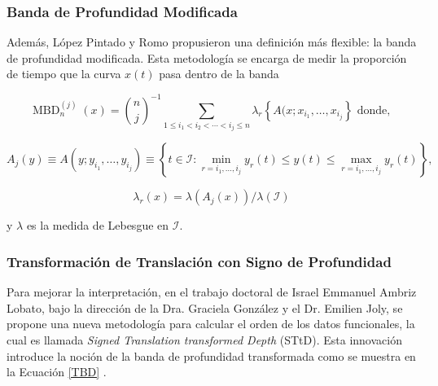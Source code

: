 \subsubsection{Banda de Profundidad Modificada}

Además, López Pintado y Romo propusieron una definición más flexible: la banda de profundidad modificada. Esta metodología se encarga de medir la proporción de tiempo que la curva $x(t)$ pasa dentro de la banda \cite{boxplotFun}

\begin{equation}
    \operatorname{MBD}_n^{(j)}(x) = \binom{n}{j}^{-1} \sum_{1 \leq i_1<i_2<\cdots<i_j \leq n} \lambda_r \left\{ A(x ; x_{i_{1}}, \dots, x_{i_{j}}\right\} \text{ donde, }
\end{equation}

\begin{equation}
     A_j(y) \equiv A\left(y ; y_{i_1}, \ldots, y_{i_j}\right) \equiv \left\{t \in \mathcal{I}: \min _{r=i_1, \ldots, i_j} y_r(t) \leq y(t) \leq \max _{r=i_1, \ldots, i_j} y_r(t) \right\},
\end{equation}

\begin{equation}
    \lambda_r(x) = \lambda(A_j(x))/\lambda(\mathcal{I})
\end{equation}

y $\lambda$ es la medida de Lebesgue en $\mathcal{I}$.
\subsubsection{Transformación de Translación con Signo de Profundidad}

    Para mejorar la interpretación, en el trabajo doctoral de Israel Emmanuel Ambriz Lobato, bajo la dirección de la Dra. Graciela González y el Dr. Emilien Joly, se propone una nueva metodología para calcular el orden de los datos funcionales, la cual es llamada \textit{Signed Translation transformed Depth} (STtD). Esta innovación introduce la noción de la banda de profundidad transformada como se muestra en la Ecuación \eqref{TBD} \cite{BandaEmanuel}.
    
